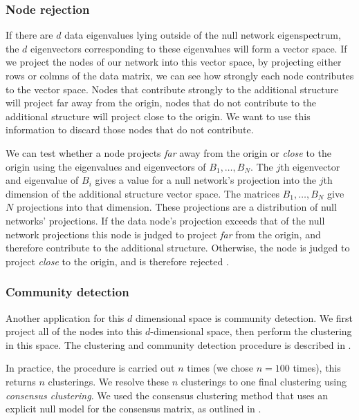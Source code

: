 \documentclass[a4paper,12pt]{article}
\theoremstyle{definition}
\begin{document}
        \subsubsection{Node rejection}
        If there are $d$ data eigenvalues lying outside of the null network eigenspectrum, the $d$ eigenvectors corresponding to these eigenvalues will form a vector space. If we project the nodes of our network into this vector space, by projecting either rows or colmns of the data matrix, we can see how strongly each node contributes to the vector space. Nodes that contribute strongly to the additional structure will project far away from the origin, nodes that do not contribute to the additional structure will project close to the origin. We want to use this information to discard those nodes that do not contribute.

        We can test whether a node projects \textit{far} away from the origin or \textit{close} to the origin using the eigenvalues and eigenvectors of $B_1, \dots, B_N$. The $j$th eigenvector and eigenvalue of $B_i$ gives a value for a null network's projection into the $j$th dimension of the additional structure vector space. The matrices $B_1, \dots, B_N$ give $N$ projections into that dimension. These projections are a distribution of null networks' projections. If the data node's projection exceeds that of the null network projections this node is judged to project \textit{far} from the origin, and therefore contribute to the additional structure. Otherwise, the node is judged to project \textit{close} to the origin, and is therefore rejected \cite{humphries}.

        \subsubsection{Community detection}
        Another application for this $d$ dimensional space is community detection. We first project all of the nodes into this $d$-dimensional space, then perform the clustering in this space. The clustering and community detection procedure is described in \cite{humphries2}. 

        In practice, the procedure is carried out $n$ times (we chose $n=100$ times), this returns $n$ clusterings. We resolve these $n$ clusterings to one final clustering using \textit{consensus clustering}. We used the consensus clustering method that uses an explicit null model for the consensus matrix, as outlined in \cite{humphries}.
\end{document}
